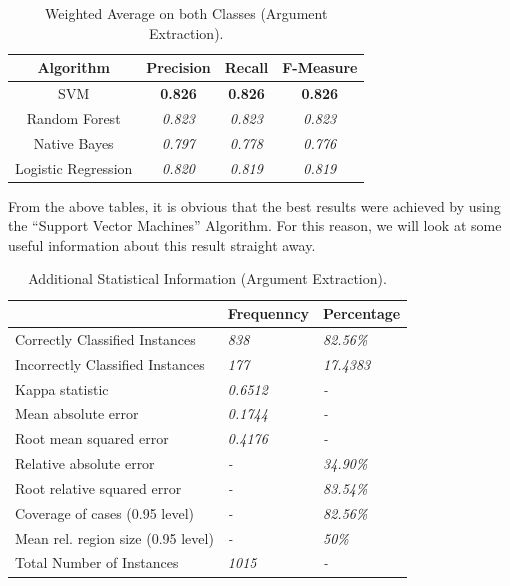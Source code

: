 \begin{table}[H]
\centering
\caption{Weighted Average on both Classes (Argument Extraction).}
\label{43_table_ref}
\begin{tabular}{cccc}
\hline
{\bf Algorithm}     & {\bf Precision} & {\bf Recall}    & {\bf F-Measure} \\ \hline
SVM                 & {\bf 0.826} 	 & {\bf 0.826}     & {\bf 0.826} \\
Random Forest       & {\it 0.823}     & {\it 0.823}     & {\it 0.823}     \\
Native Bayes        & {\it 0.797}     & {\it 0.778}     & {\it 0.776}     \\
Logistic Regression & {\it 0.820}     & {\it 0.819}     & {\it 0.819}     \\ \hline
\end{tabular}
\end{table}

From the above tables, it is obvious that the best results were achieved by using the ``Support Vector Machines'' Algorithm. For this reason, we will look at some useful information  about this result straight away.

\begin{table}[H]
\centering
\caption{Additional Statistical Information (Argument Extraction).}
\label{44_table_ref}
\begin{tabular}{lll}
\hline
                                   & {\bf Frequenncy} & {\bf Percentage} \\ \hline
Correctly Classified Instances     & {\it 838}        & {\it 82.56\%}    \\
Incorrectly Classified Instances   & {\it 177}        & {\it 17.4383}    \\
Kappa statistic                    & {\it 0.6512}     & {\it -}          \\
Mean absolute error                & {\it 0.1744}     & {\it -}          \\
Root mean squared error            & {\it 0.4176}     & {\it -}          \\
Relative absolute error            & {\it -}          & {\it 34.90\%}    \\
Root relative squared error        & {\it -}          & {\it 83.54\%}    \\
Coverage of cases (0.95 level)     & {\it -}          & {\it 82.56\%}    \\
Mean rel. region size (0.95 level) & {\it -}          & {\it 50\%}       \\
Total Number of Instances          & {\it 1015}       & {\it -}          \\ \hline
\end{tabular}
\end{table}



